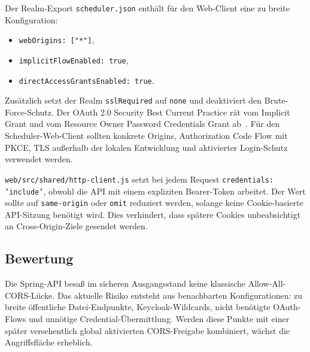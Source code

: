 Der Realm-Export \texttt{scheduler.json} enthält für den Web-Client
eine zu breite Konfiguration:

\begin{itemize}
  \item \texttt{webOrigins: ["*"]},
  \item \texttt{implicitFlowEnabled: true},
  \item \texttt{directAccessGrantsEnabled: true}.
\end{itemize}

Zusätzlich setzt der Realm \texttt{sslRequired} auf \texttt{none} und
deaktiviert den Brute-Force-Schutz. Der OAuth 2.0 Security Best
Current Practice rät vom Implicit Grant und vom Resource Owner
Password Credentials Grant ab~\cite{rfc9700}. Für den
Scheduler-Web-Client sollten konkrete Origins, Authorization Code
Flow mit PKCE, TLS außerhalb der lokalen Entwicklung und aktivierter
Login-Schutz verwendet werden.

\texttt{web/src/shared/http-client.js} setzt bei jedem Request
\texttt{credentials: 'include'}, obwohl die API mit einem expliziten
Bearer-Token arbeitet. Der Wert sollte auf \texttt{same-origin} oder
\texttt{omit} reduziert werden, solange keine Cookie-basierte
API-Sitzung benötigt wird. Dies verhindert, dass spätere Cookies
unbeabsichtigt an Cross-Origin-Ziele gesendet werden.

\subsection{Bewertung}

Die Spring-API besaß im sicheren Ausgangsstand keine klassische
Allow-All-CORS-Lücke. Das aktuelle Risiko entsteht aus benachbarten
Konfigurationen: zu breite öffentliche Datei-Endpunkte,
Keycloak-Wildcards, nicht benötigte OAuth-Flows und unnötige
Credential-Übermittlung. Werden diese Punkte mit einer später
versehentlich global aktivierten CORS-Freigabe kombiniert, wächst die
Angriffsfläche erheblich.
